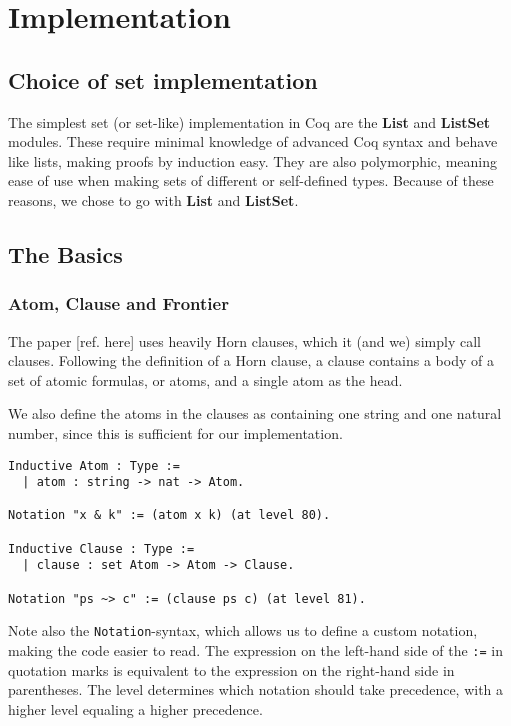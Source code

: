 \chapter{Implementation}

\section{Choice of set implementation}

The simplest set (or set-like) implementation in Coq are the \textbf{List} and \textbf{ListSet} modules.
These require minimal knowledge of advanced Coq syntax and behave like lists, making proofs by induction easy.
They are also polymorphic, meaning ease of use when making sets of different or self-defined types.
Because of these reasons, we chose to go with \textbf{List} and \textbf{ListSet}.

\section{The Basics}
\subsection{Atom, Clause and Frontier}

The paper [ref. here] uses heavily Horn clauses, which it (and we) simply call clauses.
Following the definition of a Horn clause, a clause contains a body of a set of atomic formulas,
or atoms, and a single atom as the head.

We also define the atoms in the clauses as containing one string and one natural number,
since this is sufficient for our implementation.

\begin{minipage}{\linewidth}
\begin{lstlisting}[language=Coq, label={lst:atom_clause_def}, caption={Def. of \lstinline{Atom} and \lstinline{Clause} in Coq}]
Inductive Atom : Type :=
  | atom : string -> nat -> Atom.

Notation "x & k" := (atom x k) (at level 80).

Inductive Clause : Type :=
  | clause : set Atom -> Atom -> Clause.

Notation "ps ~> c" := (clause ps c) (at level 81).
\end{lstlisting}
\end{minipage}

Note also the \lstinline{Notation}-syntax, which allows us to define a custom notation,
making the code easier to read. The expression on the left-hand side of the \lstinline{:=} in quotation marks
is equivalent to the expression on the right-hand side in parentheses.
The level determines which notation should take precedence, with a higher level equaling a higher precedence.

